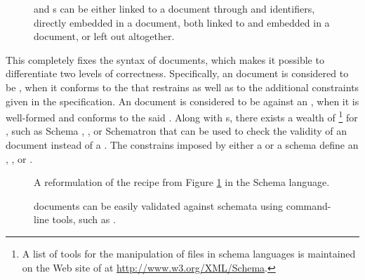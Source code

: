 \documentclass[
  a5paper,10pt,           %
  dvipsnames              %
]{book}
\begin{document}
\begin{figure}
  \caption{ and  s can be either linked
    to a document through  and  identifiers,
    directly embedded in a document, both linked to and embedded in a document,
    or left out altogether.}
  \label{fig:recipe-dtd}
\end{figure}
        
This  completely fixes the syntax of  documents, which
makes it possible to differentiate two levels of correctness. Specifically, an
 document is considered to be %
, when it conforms to the 
 that restrains  as well as to the additional
constraints given in the specification. An  document is
considered to be   against an
 , when it is well-formed and conforms to the said
 .  Along with s, there exists a wealth
of \footnote{
  A list of tools for the manipulation of files in  schema
  languages is maintained on the Web site of  at
  \url{http://www.w3.org/XML/Schema}.
} for , such as   Schema%
, , or Schematron that can be used to
check the validity of an  document instead of a .
The constrains imposed by either a  or a schema define an
, , or .
 

\begin{figure}
  \caption{A reformulation of the recipe  from Figure
    \ref{fig:recipe-dtd} in the  Schema 
    language.}
  \label{fig:recipe-xsd}
\end{figure}

\begin{figure}
  \caption{ documents can be easily validated against 
    schemata using command-line tools, such as .}
\end{figure}
\end{document}
